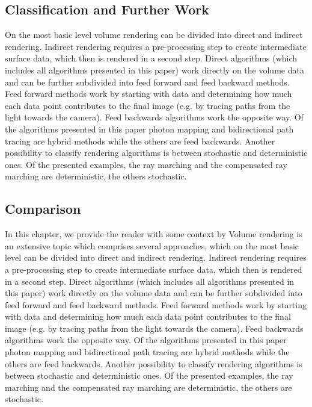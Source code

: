 \subsection{Classification and Further Work}
On the most basic level volume rendering can be divided into direct and indirect rendering\cite{Westover1991SplattingAP, 4384237}. Indirect rendering requires a pre-processing step to create intermediate surface data, which then is rendered in a second step.
Direct algorithms (which includes all algorithms presented in this paper) work directly on the volume data and can be further subdivided into feed forward and feed backward methods. Feed forward methods work by starting with data and determining how much each data point contributes to the final image \cite{10.5555/94788} (e.g. by tracing paths from the light towards the camera).
Feed backwards algorithms work the opposite way. Of the algorithms presented in this paper photon mapping and bidirectional path tracing are hybrid methods while the others are feed backwards.
Another possibility to classify rendering algorithms is between stochastic and deterministic ones. Of the presented examples, the ray marching  and the compensated ray marching are deterministic, the others stochastic. 
\subsection{Comparison}



In this chapter, we provide the reader with some context by 
Volume rendering is an extensive topic which comprises several approaches, which on the most basic level can be divided into direct and indirect rendering\cite{Westover1991SplattingAP, 4384237}. Indirect rendering requires a pre-processing step to create intermediate surface data, which then is rendered in a second step.
Direct algorithms (which includes all algorithms presented in this paper) work directly on the volume data and can be further subdivided into feed forward and feed backward methods. Feed forward methods work by starting with data and determining how much each data point contributes to the final image \cite{10.5555/94788} (e.g. by tracing paths from the light towards the camera).
Feed backwards algorithms work the opposite way. Of the algorithms presented in this paper photon mapping and bidirectional path tracing are hybrid methods while the others are feed backwards.
Another possibility to classify rendering algorithms is between stochastic and deterministic ones. Of the presented examples, the ray marching  and the compensated ray marching are deterministic, the others are stochastic. 





